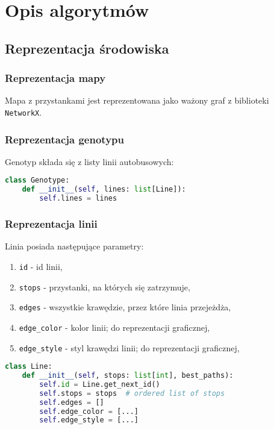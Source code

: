 \documentclass[12pt,a4paper,openright]{mwrep}
\begin{document}
\chapter{Opis algorytmów}

\section{Reprezentacja środowiska}
\subsection{Reprezentacja mapy}
Mapa z przystankami jest reprezentowana jako ważony graf z biblioteki \lstinline{NetworkX}.

\subsection{Reprezentacja genotypu}
Genotyp składa się z listy linii autobusowych:
\begin{lstlisting}[language=Python]
class Genotype:
    def __init__(self, lines: list[Line]):
        self.lines = lines
\end{lstlisting}

\subsection{Reprezentacja linii}
Linia posiada następujące parametry:
\begin{enumerate}
    \item \lstinline{id} - id linii,
    \item \lstinline{stops} - przystanki, na których się zatrzymuje,
    \item \lstinline{edges} - wszystkie krawędzie, przez które linia przejeżdża,
    \item \lstinline{edge_color} - kolor linii; do reprezentacji graficznej,
    \item \lstinline{edge_style} - styl krawędzi linii; do reprezentacji graficznej,
\end{enumerate}


\begin{lstlisting}[language=Python]
class Line:
    def __init__(self, stops: list[int], best_paths):
        self.id = Line.get_next_id()
        self.stops = stops  # ordered list of stops
        self.edges = []
        self.edge_color = [...]
        self.edge_style = [...]
\end{lstlisting}
\end{document}
